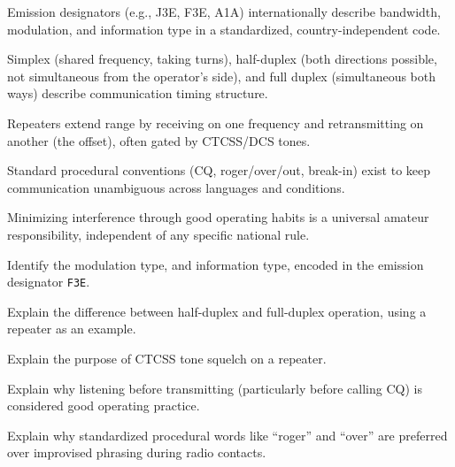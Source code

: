\begin{quickreview}
\item Emission designators (e.g., J3E, F3E, A1A) internationally
describe bandwidth, modulation, and information type in a standardized,
country-independent code.
\item Simplex (shared frequency, taking turns), half-duplex (both
directions possible, not simultaneous from the operator's side), and
full duplex (simultaneous both ways) describe communication timing
structure.
\item Repeaters extend range by receiving on one frequency and
retransmitting on another (the offset), often gated by CTCSS/DCS tones.
\item Standard procedural conventions (CQ, roger/over/out, break-in)
exist to keep communication unambiguous across languages and
conditions.
\item Minimizing interference through good operating habits is a
universal amateur responsibility, independent of any specific national
rule.
\end{quickreview}

\begin{practiceproblems}
\item Identify the modulation type, and information type, encoded in
the emission designator \texttt{F3E}.
\item Explain the difference between half-duplex and full-duplex
operation, using a repeater as an example.
\item Explain the purpose of CTCSS tone squelch on a repeater.
\item Explain why listening before transmitting (particularly before
calling CQ) is considered good operating practice.
\item Explain why standardized procedural words like ``roger'' and
``over'' are preferred over improvised phrasing during radio contacts.
\end{practiceproblems}
